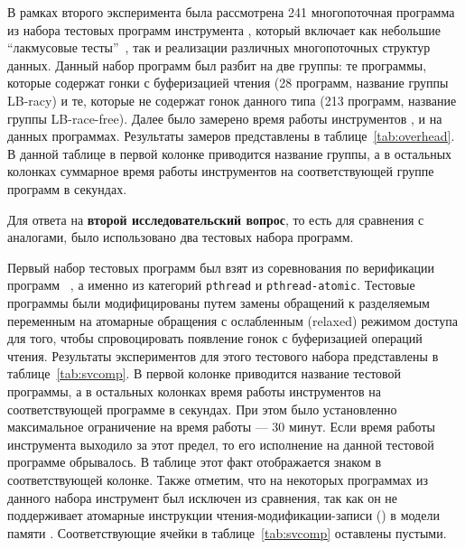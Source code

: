 

В рамках второго эксперимента была рассмотрена 241 многопоточная программа 
из набора тестовых программ инструмента \genmc, 
который включает как небольшие ``лакмусовые тесты''~\cite{Alglave-al:TACAS2011}, 
так и реализации различных многопоточных структур данных.
Данный набор программ был разбит на две группы:
те программы, которые содержат гонки с буферизацией чтения 
(28 программ, название группы LB-racy)
и те, которые не содержат гонок данного типа 
(213 программ, название группы LB-race-free).
Далее было замерено время работы инструментов \genmc, \hmc и \wmc на данных программах.  
Результаты замеров представлены в таблице~\ref{tab:overhead}.
В данной таблице в первой колонке приводится название группы, 
а в остальных колонках суммарное время работы инструментов 
на соответствующей группе программ в секундах.



Для ответа на \textbf{второй исследовательский вопрос}, 
то есть для сравнения \wmc с аналогами, 
было использовано два тестовых набора программ.

Первый набор тестовых программ был взят 
из соревнования по верификации программ \SVCOMP~\cite{SVCOMP}, 
а именно из категорий \texttt{pthread} и \texttt{pthread-atomic}.
Тестовые программы были модифицированы путем замены 
обращений к разделяемым переменным на атомарные обращения 
с ослабленным (relaxed) режимом доступа 
для того, чтобы спровоцировать появление гонок с буферизацией операций чтения. 
Результаты экспериментов для этого тестового набора 
представлены в таблице~\ref{tab:svcomp}. 
В первой колонке приводится название тестовой программы, 
а в остальных колонках время работы инструментов 
на соответствующей программе в секундах.
При этом было установленно максимальное ограничение на время работы --- 30 минут.
Если время работы инструмента выходило за этот предел, 
то его исполнение на данной тестовой программе обрывалось. 
В таблице этот факт отображается знаком \timeoutNoSpc
в соответствующей колонке.
Также отметим, что на некоторых программах из данного набора 
инструмент \Nidhugg был исключен из сравнения, так как он не поддерживает 
атомарные инструкции чтения-модификации-записи (\RMW) в модели памяти \POWER. 
Соответствующие ячейки в таблице~\ref{tab:svcomp} оставлены пустыми.



